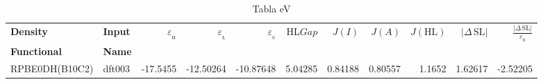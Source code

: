 \documentclass[preprint,landscape,12pt]{elsarticle}
\begin{document}
	\begin{table}
		\caption{ Tabla eV}
		\centering
		\footnotesize
		\begin{tabular}{llrrrrrrrrr}
			\hline
			\textbf{Density} & \textbf{Input} &$\varepsilon_{_{\mathrm{H}}}$	& $\varepsilon_{_{\mathrm{L}}}$  & $\varepsilon_{_{\mathrm{S}}}$& HL$Gap$ & $J(I)$ & $J(A)$ & $J(\mathrm{HL})$  & \textbf{$\left|\Delta\,\mathrm{SL}\right|$} & $\frac{\left|\Delta\,\mathrm{SL}\right|}{\varepsilon_{_{\mathrm{H}}}}$ \\
			\textbf{Functional} & \textbf{Name}&   &  &     &   &  &  &  &  &\\
			\hline \hline 

RPBE0DH(B10C2) & dft003 & -17.5455 & -12.50264 & -10.87648 & 5.04285 & 0.84188 & 0.80557 & 1.1652 & 1.62617 & -2.52205\\

	 		\hline
		\end{tabular}
			\label{tab:eV}
	\end{table}
\end{document}
